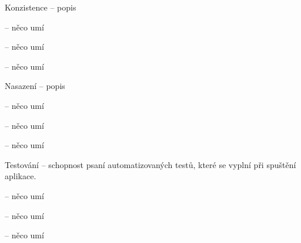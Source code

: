 \begin{dl}
   \item[Konzistence] – popis
\end{dl}
\begin{ul}
   \item {} – něco umí
   \item {} – něco umí
   \item {} – něco umí
\end{ul}

\begin{dl}
   \item[Nasazení] – popis
\end{dl}
\begin{ul}
   \item {} – něco umí
   \item {} – něco umí
   \item {} – něco umí
\end{ul}

\begin{dl}
   \item[Testování] – schopnost psaní automatizovaných testů, které se vyplní při spuštění aplikace.
\end{dl}
\begin{ul}
   \item {} – něco umí
   \item {} – něco umí
   \item {} – něco umí
\end{ul}
